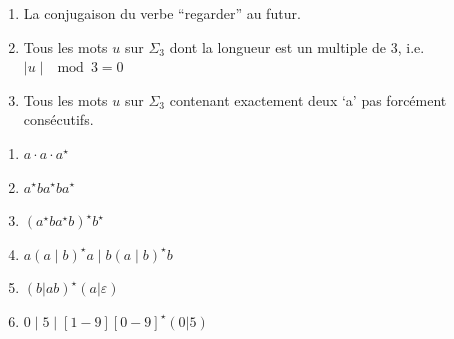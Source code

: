 \begin{corrections}

  \begin{questions}

  \item
    \begin{enumerate}
    \item La conjugaison du verbe ``regarder'' au futur.
    \item Tous les mots $u$ sur $\Sigma_3$ dont la longueur est un multiple de 3, i.e. $\mid u\mid  \mod 3 = 0$
    \item Tous les mots $u$ sur $\Sigma_3$ contenant exactement deux `a' pas forcément consécutifs.
    \end{enumerate}

  \item
    \begin{enumerate}
    \item $a \cdot a \cdot a^\star$
    \item $a^\star b a^\star b a^\star$
    \item $(a^\star b a^\star b)^\star b^\star$
    \item $a (a\mid b)^\star a \mid b (a\mid b)^\star b$
    \item $(b|ab)^\star (a|\varepsilon)$
    \item $0\mid 5 \mid [1-9][0-9]^\star(0|5)$
    \end{enumerate}

  \end{questions}

\end{corrections}

\endgroup
\endinput
